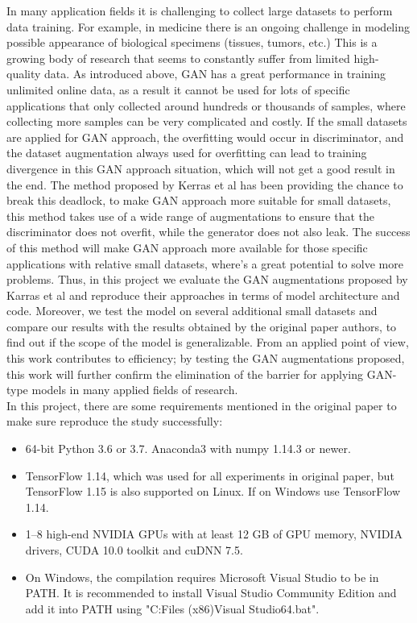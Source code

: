 \documentclass{report}
\begin{document}
In many application fields it is challenging to collect large datasets to perform data training. For example, in medicine there is an ongoing challenge in modeling possible appearance of biological specimens (tissues, tumors, etc.) This is a growing body of research that seems to constantly suffer from limited high-quality data. As introduced above, GAN has a great performance in training unlimited online data\cite{goodfellow2014generative, miyato2018cgans, miyato2018spectral, brock2018large, karras2017progressive, karras2019style, karras2020analyzing}, as a result it cannot be used for lots of specific applications that only collected around hundreds or thousands of samples, where collecting more samples can be very complicated and costly. If the small datasets are applied for GAN approach, the overfitting would occur in discriminator, and the dataset augmentation always used for overfitting can lead to training divergence in this GAN approach situation, which will not get a good result in the end. The method proposed by Kerras et al has been providing the chance to break this deadlock, to make GAN approach more suitable for small datasets, this method takes use of a wide range of augmentations to ensure that the discriminator does not overfit, while the generator does not also leak. The success of this method will make GAN approach more available for those specific applications with relative small datasets, where's a great potential to solve more problems. Thus, in this project we evaluate the GAN augmentations proposed by Karras et al and reproduce their approaches in terms of model architecture and code. Moreover, we test the model on several additional small datasets and compare our results with the results obtained by the original paper authors, to find out if the scope of the model is generalizable. From an applied point of view, this work contributes to efficiency; by testing the GAN augmentations proposed, this work will further confirm the elimination of the barrier for applying GAN-type
models in many applied fields of research. \\

In this project, there are some requirements mentioned in the original paper to make sure reproduce the study successfully:
\begin{itemize}
    \item 64-bit Python 3.6 or 3.7. Anaconda3 with numpy 1.14.3 or newer.
    \item TensorFlow 1.14, which was used for all experiments in original  paper, but TensorFlow 1.15 is also supported on Linux. If on Windows use TensorFlow 1.14.
    \item 1–8 high-end NVIDIA GPUs with at least 12 GB of GPU memory, NVIDIA drivers, CUDA 10.0 toolkit and cuDNN 7.5.
    \item On Windows, the compilation requires Microsoft Visual Studio to be in PATH. It is recommended to install  Visual Studio Community Edition and add it into PATH using "C:\Program Files (x86)\Microsoft Visual Studio\Community\VC\Auxiliary\Build\vcvars64.bat".
\end{itemize}
\end{document}

